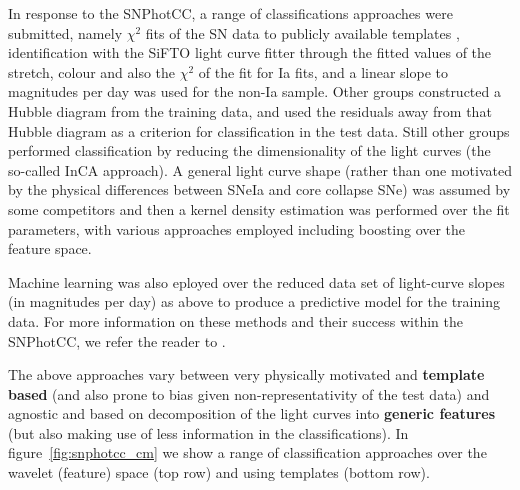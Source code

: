 In response to the SNPhotCC, a range of classifications approaches were submitted, namely $\chi^{2}$ fits of the SN data to publicly available templates \citep[see the][templates,]{2002PASP..114..803N}, identification with the SiFTO light curve fitter \citep{2008ApJ...681..482C} through the fitted values of the stretch, colour and also the $\chi^{2}$ of the fit for Ia fits, and a linear slope to magnitudes per day was used for the non-Ia sample.
Other groups constructed a Hubble diagram from the training data, and used the residuals away from that Hubble diagram as a criterion for classification in the test data. Still other groups performed classification by reducing the dimensionality of the light curves (the so-called InCA approach).
A general light curve shape (rather than one motivated by the physical differences between SNeIa and core collapse SNe) was assumed by some competitors and then a kernel density estimation was performed over the fit parameters, with various approaches employed including boosting over the feature space.

Machine learning was also eployed over the reduced data set of light-curve slopes (in magnitudes per day) as above to produce a predictive model for the training data. For more information on these methods and their success within the SNPhotCC, we refer the reader to \cite{kessler_results_2010}.

The above approaches vary between very physically motivated and \textbf{template based} (and also prone to bias given non-representativity of the test data) and agnostic and based on decomposition of the light curves into \textbf{generic features} (but also making use of less information in the classifications).
In figure~\ref{fig:snphotcc_cm} we show a range of classification approaches over the wavelet (feature) space (top row) and using templates (bottom row).

